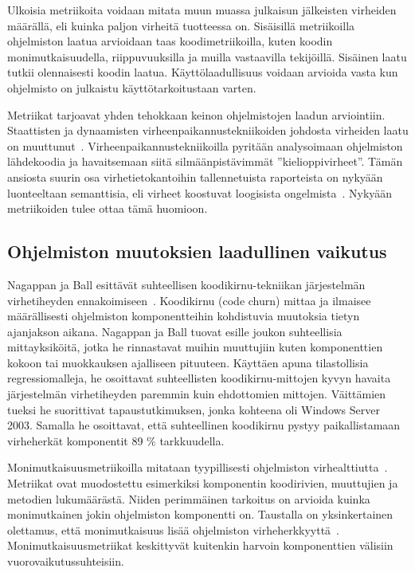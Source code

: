 \documentclass[finnish]{../tktltiki2}
\theoremstyle{definition}
\theoremstyle{remark}
\begin{document}
    Ulkoisia metriikoita voidaan mitata muun muassa julkaisun jälkeisten virheiden määrällä, eli kuinka paljon virheitä 
tuotteessa on. Sisäisillä metriikoilla ohjelmiston laatua arvioidaan taas koodimetriikoilla, kuten koodin 
monimutkaisuudella, riippuvuuksilla ja muilla vastaavilla tekijöillä. Sisäinen laatu tutkii olennaisesti koodin laatua. 
Käyttölaadullisuus voidaan arvioida vasta kun ohjelmisto on julkaistu käyttötarkoitustaan varten.

    Metriikat tarjoavat yhden tehokkaan keinon ohjelmistojen laadun arviointiin. Staattisten ja dynaamisten 
virheenpaikannustekniikoiden johdosta virheiden laatu on muuttunut~\cite{ZN08}. Virheenpaikannustekniikoilla pyritään 
analysoimaan ohjelmiston lähdekoodia ja havaitsemaan siitä silmäänpistävimmät ''kielioppivirheet''. Tämän ansiosta 
suurin osa virhetietokantoihin tallennetuista raporteista on nykyään luonteeltaan semanttisia, eli virheet koostuvat 
loogisista ongelmista~\cite{ZN08}. Nykyään metriikoiden tulee ottaa tämä huomioon.

\subsection{Ohjelmiston muutoksien laadullinen vaikutus}

Nagappan ja Ball esittävät suhteellisen koodikirnu-tekniikan järjestelmän virhetiheyden ennakoimiseen~\cite{NB05}. 
Koodikirnu (code churn) mittaa ja ilmaisee määrällisesti ohjelmiston komponentteihin kohdistuvia muutoksia tietyn 
ajanjakson aikana. Nagappan ja Ball tuovat esille joukon suhteellisia mittayksiköitä, jotka he rinnastavat muihin 
muuttujiin kuten komponenttien kokoon tai muokkauksen ajalliseen pituuteen. Käyttäen apuna tilastollisia 
regressiomalleja, he osoittavat suhteellisten koodikirnu-mittojen kyvyn havaita järjestelmän virhetiheyden paremmin kuin 
ehdottomien mittojen. Väittämien tueksi he suorittivat tapaustutkimuksen, jonka kohteena oli Windows Server 2003. 
Samalla he osoittavat, että suhteellinen koodikirnu pystyy paikallistamaan virheherkät komponentit 89 \% tarkkuudella.

    Monimutkaisuusmetriikoilla mitataan tyypillisesti ohjelmiston virhealttiutta~\cite{ZN08}. Metriikat ovat muodostettu 
esimerkiksi komponentin koodirivien, muuttujien ja metodien lukumäärästä. Niiden perimmäinen tarkoitus on arvioida 
kuinka monimutkainen jokin ohjelmiston komponentti on. Taustalla on yksinkertainen olettamus, että monimutkaisuus lisää 
ohjelmiston virheherkkyyttä~\cite{NB05, NB07, ZN08, MNDT09}. Monimutkaisuusmetriikat keskittyvät kuitenkin harvoin 
komponenttien välisiin vuorovaikutussuhteisiin.
\end{document}
